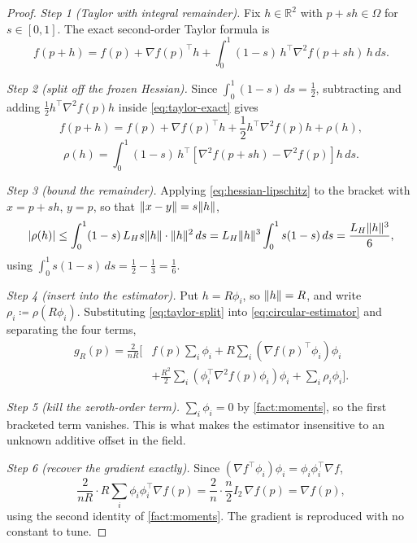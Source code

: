 \documentclass[11pt,a4paper]{article}
\theoremstyle{plain}
\theoremstyle{definition}
\newcommand{\R}{\mathbb{R}}
\DeclarePairedDelimiter{\norm}{\lVert}{\rVert}
\DeclarePairedDelimiter{\abs}{\lvert}{\rvert}
\begin{document}
\begin{proof}
\emph{Step 1 (Taylor with integral remainder).} Fix $h\in\R^2$ with $p+sh\in\Omega$ for
$s\in[0,1]$. The exact second-order Taylor formula is
\begin{equation}\label{eq:taylor-exact}
    f(p+h)=f(p)+\nabla f(p)^{\top}h
    +\int_0^1(1-s)\,h^{\top}\nabla^2f(p+sh)\,h\,ds .
\end{equation}

\emph{Step 2 (split off the frozen Hessian).} Since $\int_0^1(1-s)\,ds=\frac12$, subtracting and
adding $\frac12h^{\top}\nabla^2f(p)h$ inside \eqref{eq:taylor-exact} gives
\begin{equation}\label{eq:taylor-split}
    f(p+h)=f(p)+\nabla f(p)^{\top}h+\frac12h^{\top}\nabla^2f(p)h+\rho(h),
\end{equation}
\begin{equation}\label{eq:remainder-def}
    \rho(h)=\int_0^1(1-s)\,h^{\top}
    \left[\nabla^2f(p+sh)-\nabla^2f(p)\right]h\,ds .
\end{equation}

\emph{Step 3 (bound the remainder).} Applying \eqref{eq:hessian-lipschitz} to the bracket with
$x=p+sh$, $y=p$, so that $\norm{x-y}=s\norm{h}$,
\begin{equation*}
    \abs{\rho(h)}
    \leq\int_0^1(1-s)\,L_Hs\norm{h}\cdot\norm{h}^2\,ds
    =L_H\norm{h}^3\int_0^1s(1-s)\,ds
    =\frac{L_H\norm{h}^3}{6},
\end{equation*}
using $\int_0^1s(1-s)\,ds=\frac12-\frac13=\frac16$.

\emph{Step 4 (insert into the estimator).} Put $h=R\phi_i$, so $\norm{h}=R$, and write
$\rho_i\coloneqq\rho(R\phi_i)$. Substituting \eqref{eq:taylor-split} into
\eqref{eq:circular-estimator} and separating the four terms,
\begin{align*}
    g_R(p)=\frac{2}{nR}\Bigg[
    &f(p)\sum_i\phi_i
    +R\sum_i\left(\nabla f(p)^{\top}\phi_i\right)\phi_i\\
    &+\frac{R^2}{2}\sum_i\left(\phi_i^{\top}\nabla^2f(p)\phi_i\right)\phi_i
    +\sum_i\rho_i\phi_i\Bigg].
\end{align*}

\emph{Step 5 (kill the zeroth-order term).} $\sum_i\phi_i=0$ by \cref{fact:moments}, so the
first bracketed term vanishes. This is what makes the estimator insensitive to an unknown
additive offset in the field.

\emph{Step 6 (recover the gradient exactly).} Since
$\left(\nabla f^{\top}\phi_i\right)\phi_i=\phi_i\phi_i^{\top}\nabla f$,
\begin{equation*}
    \frac{2}{nR}\cdot R\sum_i\phi_i\phi_i^{\top}\nabla f(p)
    =\frac{2}{n}\cdot\frac n2I_2\,\nabla f(p)
    =\nabla f(p),
\end{equation*}
using the second identity of \cref{fact:moments}. The gradient is reproduced with no constant to
tune.


\end{proof}
\end{document}
